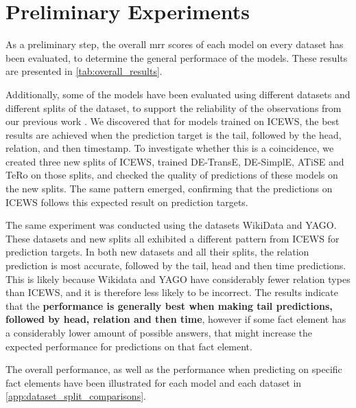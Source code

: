 \section{Preliminary Experiments}
\label{sec:preliminary_experiments}

As a preliminary step, the overall \gls{mrr} scores of each model on every dataset has been evaluated, to determine the general performace of the models. These results are presented in \autoref{tab:overall_results}. 



Additionally, some of the models have been evaluated using different datasets and different splits of the dataset, to support the reliability of the observations from our previous work \cite{P9}. We discovered that for models trained on ICEWS, the best results are achieved when the prediction target is the tail, followed by the head, relation, and then timestamp. To investigate whether this is a coincidence, we created three new splits of ICEWS, trained DE-TransE, DE-SimplE, ATiSE and TeRo on those splits, and checked the quality of predictions of these models on the new splits. The same pattern emerged, confirming that the predictions on ICEWS follows this expected result on prediction targets.

The same experiment was conducted using the datasets WikiData and YAGO. These datasets and new splits all exhibited a different pattern from ICEWS for prediction targets. In both new datasets and all their splits, the relation prediction is most accurate, followed by the tail, head and then time predictions.
This is likely because Wikidata and YAGO have considerably fewer relation types than ICEWS, and it is therefore less likely to be incorrect. The results indicate that the \textbf{performance is generally best when making tail predictions, followed by head, relation and then time}, however if some fact element has a considerably lower amount of possible answers, that might increase the expected performance for predictions on that fact element.

The overall performance, as well as the performance when predicting on specific fact elements have been illustrated for each model and each dataset in \autoref{app:dataset_split_comparisons}.

%

